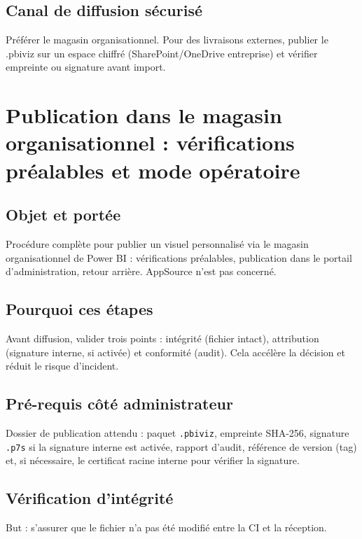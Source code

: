 \subsection{Canal de diffusion sécurisé}
Préférer le magasin organisationnel. Pour des livraisons externes, publier le .pbiviz sur un espace chiffré (SharePoint/OneDrive entreprise) et vérifier empreinte ou signature avant import.

\section{Publication dans le magasin organisationnel : vérifications préalables et mode opératoire}
\label{ann:org-store-procedure}

\subsection{Objet et portée}
Procédure complète pour publier un visuel personnalisé via le magasin organisationnel de Power BI : vérifications préalables, publication dans le portail d’administration, retour arrière. AppSource n’est pas concerné.

\subsection{Pourquoi ces étapes}
Avant diffusion, valider trois points : intégrité (fichier intact), attribution (signature interne, si activée) et conformité (audit). Cela accélère la décision et réduit le risque d’incident.

\subsection{Pré-requis côté administrateur}
Dossier de publication attendu : paquet \texttt{.pbiviz}, empreinte SHA-256, signature \texttt{.p7s} si la signature interne est activée, rapport d’audit, référence de version (tag) et, si nécessaire, le certificat racine interne pour vérifier la signature.

\subsection{Vérification d’intégrité}
But : s’assurer que le fichier n’a pas été modifié entre la CI et la réception.

